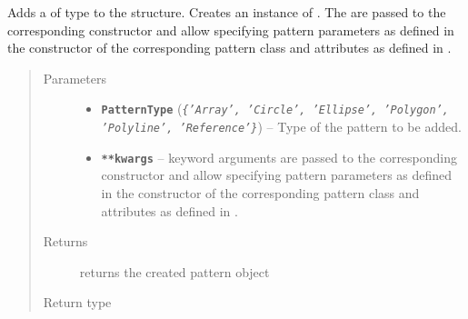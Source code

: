 \documentclass[letterpaper,10pt,english]{sphinxmanual}
\begin{document}
\begin{fulllineitems}
\begin{fulllineitems}
\label{Chapters/PythonModuleReference/Patterns/TXLWizard.Patterns.Structure:TXLWizard.Patterns.Structure.Structure.AddPattern}
Adds a  of type  to the structure.
Creates an instance of .
The  are passed to the corresponding constructor and allow specifying
pattern parameters as defined in the constructor of the corresponding pattern class
and attributes as defined in {\hyperref[Chapters/PythonModuleReference/Patterns/TXLWizard.Patterns.AbstractPattern:TXLWizard.Patterns.AbstractPattern.AbstractPattern]{}}.
\begin{quote}\begin{description}
\item[{Parameters}] \leavevmode\begin{itemize}
\item {} 
\textbf{\texttt{PatternType}} (\emph{\texttt{\{'Array', 'Circle', 'Ellipse', 'Polygon', 'Polyline', 'Reference'\}}}) -- Type of the pattern to be added.

\item {} 
\textbf{\texttt{**kwargs}} -- keyword arguments are passed to the corresponding constructor and allow specifying
pattern parameters as defined in the constructor of the corresponding pattern class
and attributes as defined in {\hyperref[Chapters/PythonModuleReference/Patterns/TXLWizard.Patterns.AbstractPattern:TXLWizard.Patterns.AbstractPattern.AbstractPattern]{}}.

\end{itemize}

\item[{Returns}] \leavevmode
returns the created pattern object

\item[{Return type}] \leavevmode
{}

\end{description}\end{quote}

\end{fulllineitems}



\end{fulllineitems}
\end{document}
